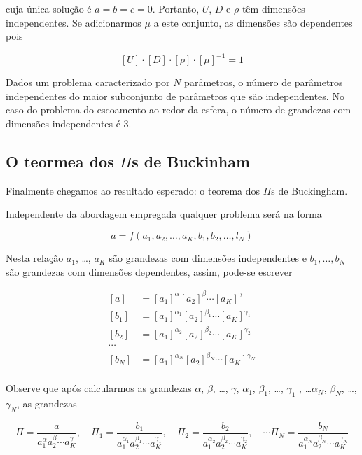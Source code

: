 cuja única solução é $a=b=c=0$. Portanto, $U$, $D$ e $\rho$ têm dimensões independentes. Se adicionarmos $\mu$ a este conjunto, as dimensões são dependentes pois

\[
  [U] \cdot [D] \cdot [\rho] \cdot [\mu]^{-1} = 1
\]

Dados um problema caracterizado por $N$ parâmetros, o número de parâmetros independentes do maior subconjunto de parâmetros que são independentes. No caso do problema do escoamento ao redor da esfera, o número de grandezas com dimensões independentes é 3.




  
  
\subsection{O teormea dos $\Pi$s de Buckinham}

Finalmente chegamos ao resultado esperado: o teorema dos $\Pi$s de Buckingham.

Independente da abordagem empregada qualquer problema será na forma

\[
a = f\left(a_1, a_2, \ldots, a_K, b_1, b_2, \ldots, l_N\right)
\]

Nesta relação $a_1$, \ldots, $a_K$ são grandezas com dimensões independentes e $b_1, \ldots, b_N$ são grandezas com dimensões dependentes, assim, pode-se escrever

\[
\begin{aligned}
  \left[a\right]  &= [a_1]^{\alpha}[a_2]^{\beta} \cdots [a_K]^{\gamma}\\
  \left[b_1\right] &= [a_1]^{\alpha_1}[a_2]^{\beta_1} \cdots [a_K]^{\gamma_1}\\
  \left[b_2\right] &= [a_1]^{\alpha_2}[a_2]^{\beta_2} \cdots [a_K]^{\gamma_2}\\
  \cdots &\\
  \left[b_N\right] &= [a_1]^{\alpha_N}[a_2]^{\beta_N} \cdots [a_K]^{\gamma_N}\\
\end{aligned}
\]

Observe que após calcularmos as grandezas $\alpha$, $\beta$, \ldots, $\gamma$, $\alpha_1$, $\beta_1$, \ldots, $\gamma_1$ , \ldots $\alpha_N$, $\beta_N$, \ldots, $\gamma_N$,
as grandezas

\[
\Pi = \frac{a}{a_1^\alpha a_2^\beta\cdots a_K^\gamma}, \quad
\Pi_1 = \frac{b_1}{a_1^{\alpha_1} a_2^{\beta_1}\cdots a_K^{\gamma_1}},\quad
\Pi_2 = \frac{b_2}{a_1^{\alpha_2} a_2^{\beta_2}\cdots a_K^{\gamma_2}},\quad
\cdots
\Pi_N = \frac{b_N}{a_1^{\alpha_N} a_2^{\beta_N}\cdots a_K^{\gamma_N}}
\]


